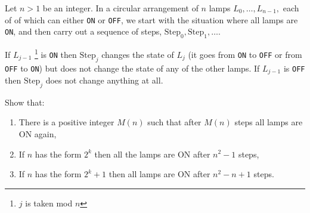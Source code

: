 Let $n > 1$ be an integer.
In a circular arrangement of $n$ lamps $L_0, \ldots, L_{n-1},$  each of of which can either \texttt{ON} or \texttt{OFF}, we start with the situation where all lamps are \texttt{ON}, and then carry out a sequence of steps, $\mathrm{Step}_0, \mathrm{Step}_1, \ldots$.

If $L_{j-1}$ \footnote{$j$ is taken mod $n$} is \texttt{ON} then $\mathrm{Step}_j$ changes the state of $L_j$ (it goes from \texttt{ON} to \texttt{OFF} or from \texttt{OFF} to \texttt{ON}) but does not change the state of any of the other lamps.
If $L_{j-1}$ is \texttt{OFF} then $\mathrm{Step}_j$ does not change anything at all.

Show that:

\begin{enumerate}[label = (\alph*)]
	\item There is a positive integer $M(n)$ such that after $M(n)$ steps all lamps are ON again,
	\item If $n$ has the form $2^k$ then all the lamps are ON after $n^2-1$ steps,
	\item If $n$ has the form $2^k + 1$ then all lamps are ON after $n^2 - n + 1$ steps.
\end{enumerate}
